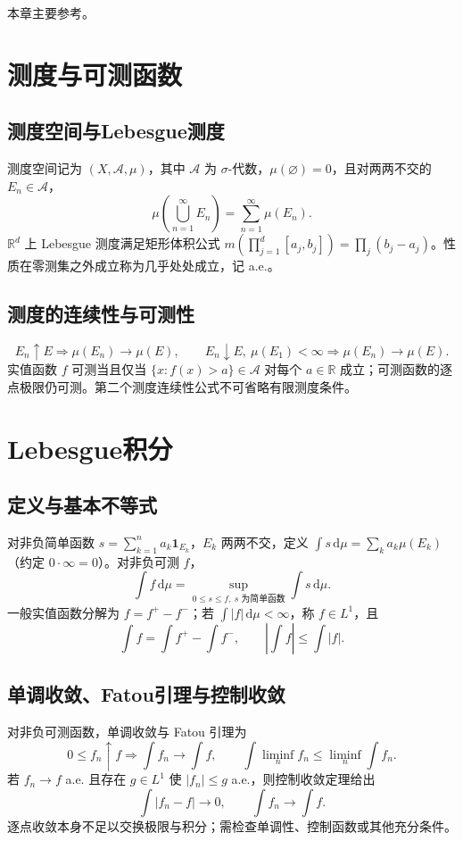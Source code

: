 \documentclass[../main.tex]{subfiles}
\begin{document}
本章主要参考\cite{brezis,hunter}。

\section{测度与可测函数}
\subsection{测度空间与Lebesgue测度}
测度空间记为 $(X,\mathcal A,\mu)$，其中 $\mathcal A$ 为 $\sigma$-代数，$\mu(\varnothing)=0$，且对两两不交的 $E_n\in\mathcal A$，
\[
\mu\!\left(\bigcup_{n=1}^\infty E_n\right)=\sum_{n=1}^\infty\mu(E_n).
\]
$\mathbb R^d$ 上 Lebesgue 测度满足矩形体积公式 $m(\prod_{j=1}^d[a_j,b_j])=\prod_j(b_j-a_j)$。性质在零测集之外成立称为几乎处处成立，记 a.e.。
\subsection{测度的连续性与可测性}
\[
E_n\uparrow E\Longrightarrow\mu(E_n)\to\mu(E),\qquad
E_n\downarrow E,\ \mu(E_1)<\infty\Longrightarrow\mu(E_n)\to\mu(E).
\]
实值函数 $f$ 可测当且仅当 $\{x:f(x)>a\}\in\mathcal A$ 对每个 $a\in\mathbb R$ 成立；可测函数的逐点极限仍可测。第二个测度连续性公式不可省略有限测度条件。
\section{Lebesgue积分}
\subsection{定义与基本不等式}
对非负简单函数 $s=\sum_{k=1}^na_k\bm1_{E_k}$，$E_k$ 两两不交，定义 $\int s\,\mathrm d\mu=\sum_ka_k\mu(E_k)$（约定 $0\cdot\infty=0$）。对非负可测 $f$，
\[
\int f\,\mathrm d\mu=\sup_{0\le s\le f,\ s\text{ 为简单函数}}\int s\,\mathrm d\mu.
\]
一般实值函数分解为 $f=f^+-f^-$；若 $\int|f|\,\mathrm d\mu<\infty$，称 $f\in L^1$，且
\[
\int f=\int f^+-\int f^-,\qquad\left|\int f\right|\le\int|f|.
\]
\subsection{单调收敛、Fatou引理与控制收敛}
对非负可测函数，单调收敛与 Fatou 引理为
\[
0\le f_n\uparrow f\Longrightarrow\int f_n\to\int f,\qquad
\int\liminf_nf_n\le\liminf_n\int f_n.
\]
若 $f_n\to f$ a.e. 且存在 $g\in L^1$ 使 $|f_n|\le g$ a.e.，则控制收敛定理给出
\[
\int|f_n-f|\to0,\qquad\int f_n\to\int f.
\]
逐点收敛本身不足以交换极限与积分；需检查单调性、控制函数或其他充分条件。
\end{document}
